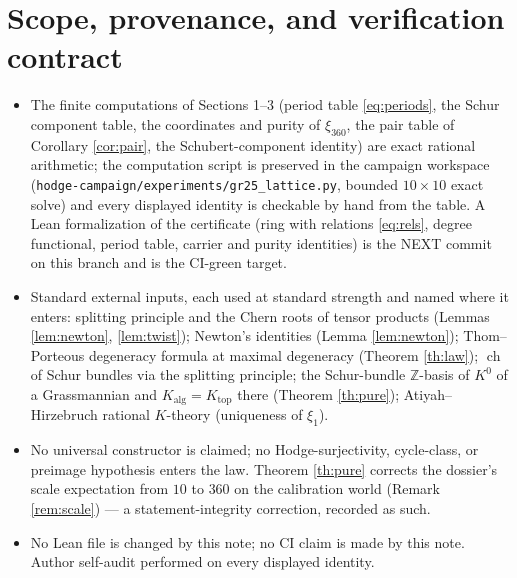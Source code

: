 \documentclass[11pt]{article}
\theoremstyle{definition}
\newcommand{\ch}{\operatorname{ch}}
\begin{document}
\section{Scope, provenance, and verification contract}
\begin{itemize}
\item The finite computations of Sections 1--3 (period table
\eqref{eq:periods}, the Schur component table, the coordinates and
purity of $\xi_{360}$, the pair table of Corollary \ref{cor:pair},
the Schubert-component identity) are exact rational arithmetic; the
computation script is preserved in the campaign workspace
(\texttt{hodge-campaign/experiments/gr25\_lattice.py}, bounded
$10\times10$ exact solve) and every displayed identity is checkable
by hand from the table. A Lean formalization of the certificate
(ring with relations \eqref{eq:rels}, degree functional, period
table, carrier and purity identities) is the NEXT commit on this
branch and is the CI-green target.
\item Standard external inputs, each used at standard strength and
named where it enters: splitting principle and the Chern roots of
tensor products (Lemmas \ref{lem:newton}, \ref{lem:twist}); Newton's
identities (Lemma \ref{lem:newton}); Thom--Porteous degeneracy
formula at maximal degeneracy (Theorem \ref{th:law});
$\ch$ of Schur bundles via the splitting principle; the Schur-bundle
$\mathbb Z$-basis of $K^0$ of a Grassmannian and $K_{\mathrm{alg}}=
K_{\mathrm{top}}$ there (Theorem \ref{th:pure}); Atiyah--Hirzebruch
rational $K$-theory (uniqueness of $\xi_1$).
\item No universal constructor is claimed; no Hodge-surjectivity,
cycle-class, or preimage hypothesis enters the law. Theorem
\ref{th:pure} corrects the dossier's scale expectation from $10$ to
$360$ on the calibration world (Remark \ref{rem:scale}) --- a
statement-integrity correction, recorded as such.
\item No Lean file is changed by this note; no CI claim is made by
this note. Author self-audit performed on every displayed identity.
\end{itemize}
\end{document}
